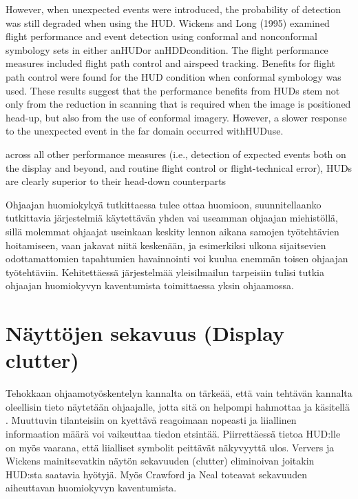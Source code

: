 \documentclass[utf8,bachelor,manualbib]{gradu3}
\begin{document}
However, when unexpected events were introduced, the probability of detection was still degraded when using the HUD. Wickens and Long (1995) examined flight performance and event detection using conformal and nonconformal symbology sets in either anHUDor anHDDcondition. The flight performance measures included flight path control and airspeed
tracking. Benefits for flight path control were found for the HUD condition when conformal symbology was used. These results suggest that the performance benefits from HUDs stem not only from the reduction in scanning that is required when the image is positioned head-up, but also from the use of conformal imagery. However, a slower response to the unexpected event in the far domain occurred withHUDuse.





















across all other performance measures (i.e., detection of expected events both on the display and beyond, and routine flight control or flight-technical error), HUDs are clearly superior to their head-down counterparts \citep{faddenym2000}

Ohjaajan huomiokykyä tutkittaessa tulee ottaa huomioon, suunnitellaanko tutkittavia järjestelmiä käytettävän yhden vai useamman ohjaajan miehistöllä, sillä molemmat ohjaajat useinkaan keskity lennon aikana samojen työtehtävien hoitamiseen, vaan jakavat niitä keskenään, ja esimerkiksi ulkona sijaitsevien odottamattomien tapahtumien havainnointi voi kuulua enemmän toisen ohjaajan työtehtäviin. Kehitettäessä järjestelmää yleisilmailun tarpeisiin tulisi tutkia ohjaajan huomiokyvyn kaventumista toimittaessa yksin ohjaamossa. \citep{crawfordneal2006}

\section{Näyttöjen sekavuus (Display clutter)}

Tehokkaan ohjaamotyöskentelyn kannalta on tärkeää, että vain tehtävän kannalta oleellisin tieto näytetään ohjaajalle, jotta sitä on helpompi hahmottaa ja käsitellä \citep{ververswickens1998}. Muuttuvin tilanteisiin on kyettävä reagoimaan nopeasti ja liiallinen informaation määrä voi vaikeuttaa tiedon etsintää. Piirrettäessä tietoa HUD:lle on myös vaarana, että liialliset symbolit peittävät näkyvyyttä ulos. Ververs ja Wickens \citeyearpar{ververswickens1996} mainitsevatkin näytön sekavuuden (clutter) eliminoivan joitakin HUD:sta saatavia hyötyjä. Myös Crawford ja Neal \citeyearpar{crawfordneal2006} toteavat sekavuuden aiheuttavan huomiokyvyn kaventumista.
\end{document}
